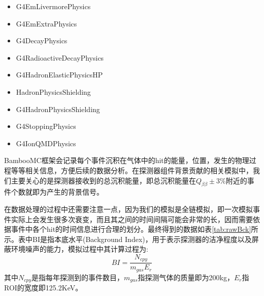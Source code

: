 \begin{itemize}
    \item G4EmLivermorePhysics
    \item G4EmExtraPhysics
    \item G4DecayPhysics
    \item G4RadioactiveDecayPhysics
    \item G4HadronElasticPhysicsHP
    \item HadronPhysicsShielding
    \item G4HadronPhysicsShielding
    \item G4StoppingPhysics
    \item G4IonQMDPhysics     
\end{itemize}
BambooMC框架会记录每个事件沉积在气体中的hit的能量，位置，发生的物理过程等等相关信息，方便后续的数据分析。在探测器组件背景贡献的相关模拟中，我们主要关心的是探测器接收到的总沉积能量，即总沉积能量在$Q_{\beta\beta}\pm3\%$附近的事件个数就即为产生的背景信号。

在数据处理的过程中还需要注意一点，因为我们的模拟是全链模拟，即一次模拟事件实际上会发生很多次衰变，而且其之间的时间间隔可能会非常的长，因而需要依据事件中各个hit的时间信息进行合理的划分。最终得到的数据如表\ref{tab:rawBck}所示。表中BI是指本底水平(Background Index)，用于表示探测器的洁净程度以及屏蔽环境噪声的能力，模拟过程中其计算过程为:
\begin{equation}
    BI = \frac{N_{cpy}}{m_{gas}E_{r}}
    \label{eq:bi}
\end{equation}
其中$N_{cpy}$是指每年探测到的事件数目，$m_{gas}$指探测气体的质量即为200kg，$E_{r}$指ROI的宽度即125.2KeV。

